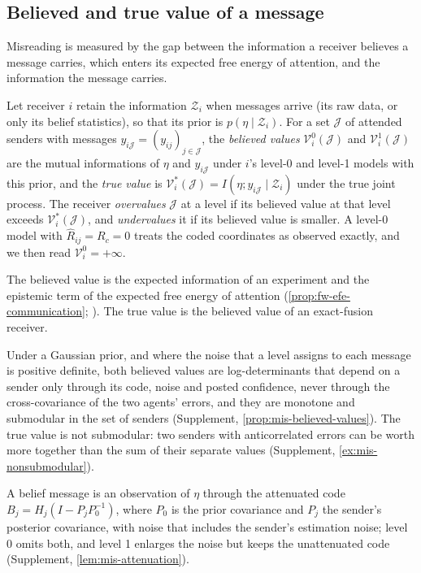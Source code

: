 \subsection{Believed and true value of a message}\label{sec:mis-values}

Misreading is measured by the gap between the information a receiver believes a message carries, which enters its expected free energy of attention, and the information the message carries.

\begin{definition}\label{def:mis-values}
Let receiver $i$ retain the information $\mathcal Z_i$ when messages arrive (its raw data, or only its belief statistics), so that its prior is $p(\eta\mid\mathcal Z_i)$. For a set $\mathcal J$ of attended senders with messages $y_{i\mathcal J}=(y_{ij})_{j\in\mathcal J}$, the \emph{believed values} $\mathcal V^0_i(\mathcal J)$ and $\mathcal V^1_i(\mathcal J)$ are the mutual informations of $\eta$ and $y_{i\mathcal J}$ under $i$'s level-0 and level-1 models with this prior, and the \emph{true value} is $\mathcal V^\ast_i(\mathcal J)=I(\eta;y_{i\mathcal J}\mid\mathcal Z_i)$ under the true joint process. The receiver \emph{overvalues} $\mathcal J$ at a level if its believed value at that level exceeds $\mathcal V^\ast_i(\mathcal J)$, and \emph{undervalues} it if its believed value is smaller. A level-0 model with $\hat R_{ij}=R_c=0$ treats the coded coordinates as observed exactly, and we then read $\mathcal V^0_i=+\infty$.
\end{definition}

The believed value is the expected information of an experiment \citep{lindley1956measure} and the epistemic term of the expected free energy of attention (\cref{prop:fw-efe-communication}; \citealp{friston2015epistemic}). The true value is the believed value of an exact-fusion receiver.

Under a Gaussian prior, and where the noise that a level assigns to each message is positive definite, both believed values are log-determinants that depend on a sender only through its code, noise and posted confidence, never through the cross-covariance of the two agents' errors, and they are monotone and submodular in the set of senders (Supplement, \cref{prop:mis-believed-values}). The true value is not submodular: two senders with anticorrelated errors can be worth more together than the sum of their separate values (Supplement, \cref{ex:mis-nonsubmodular}).

A belief message is an observation of $\eta$ through the attenuated code $B_j=H_j(I-P_jP_0^{-1})$, where $P_0$ is the prior covariance and $P_j$ the sender's posterior covariance, with noise that includes the sender's estimation noise; level 0 omits both, and level 1 enlarges the noise but keeps the unattenuated code (Supplement, \cref{lem:mis-attenuation}).

